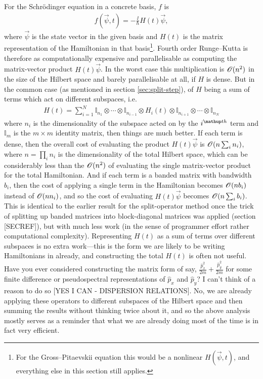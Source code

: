 For the Schr\"odinger equation in a concrete basis, $f$ is
\begin{align}
f(\vec \psi, t) = -\frac\ii\hbar H(t)\vec \psi,
\end{align}
where $\vec \psi$ is the state vector in the given basis and $H(t)$ is the matrix representation of the Hamiltonian in that basis\footnote{For the Gross--Pitaevskii equation this would be a nonlinear $H(\vec \psi, t)$, and everything else in this section still applies.}. Fourth order Runge--Kutta is therefore as computationally expensive and parallelisable as computing the matrix-vector product $H(t)\vec\psi$. In the worst case this multiplication is $\mathscr{O}(n^2)$ in the size of the Hilbert space and barely parallelisable at all, if $H$ is dense. But in the common case (as mentioned in section \ref{sec:split-step}), of $H$ being a sum of terms which act on different subspaces, i.e.
\begin{align}
H(t) = \sum_{i=1}^N \mathbb{I}_{n_1} \otimes \cdots  \otimes \mathbb{I}_{n_{i-1}}
\otimes  H_i(t) \otimes  
 \mathbb{I}_{n_{i+1}} \otimes \cdots \otimes \mathbb{I}_{n_N}
\end{align}
where $n_i$ is the dimensionality of the subspace acted on by the $i^\up{th}$ term and $\mathbb{I}_m$ is the $m\times m$ identity matrix, then things are much better. If each term is dense, then the overall cost of evaluating the product $H(t)\vec\psi$ is $\mathscr{O}(n\sum_i n_i)$, where $n = \prod_i n_i$ is the dimensionality of the total Hilbert space, which can be considerably less than the $\mathscr{O}(n^2)$ of evaluating the single  matrix-vector product for the total Hamiltonian. And if each term is a banded matrix with bandwidth $b_i$, then the cost of applying a single term in the Hamiltonian becomes $\mathscr{O}(n b_i)$ instead of $\mathscr{O}(n n_i)$, and so the cost of evaluating $H(t)\vec\psi$ becomes $\mathscr{O}(n\sum_i b_i)$. This is identical to the earlier result for the split-operator method once the trick of splitting up banded matrices into block-diagonal matrices was applied (section [SECREF]), but with much less work (in the sense of programmer effort rather computational complexity). Representing $H(t)$ as a sum of terms over different subspaces is no extra work---this is the form we are likely to be writing Hamiltonians in already, and constructing the total $H(t)$ is often not useful. Have you ever considered constructing the matrix form of say, $\frac {\hat p_x^2} {2m} + \frac {\hat p_y^2} {2m}$ for some finite difference or pseudospectral representations of $\hat p_x$ and $\hat p_y$? I can't think of a reason to do so [YES I CAN - DISPERSION RELATIONS]. No, we are already applying these operators to different subspaces of the Hilbert space and then summing the results without thinking twice about it, and so the above analysis mostly serves as a reminder that what we are already doing most of the time is in fact very efficient. 


